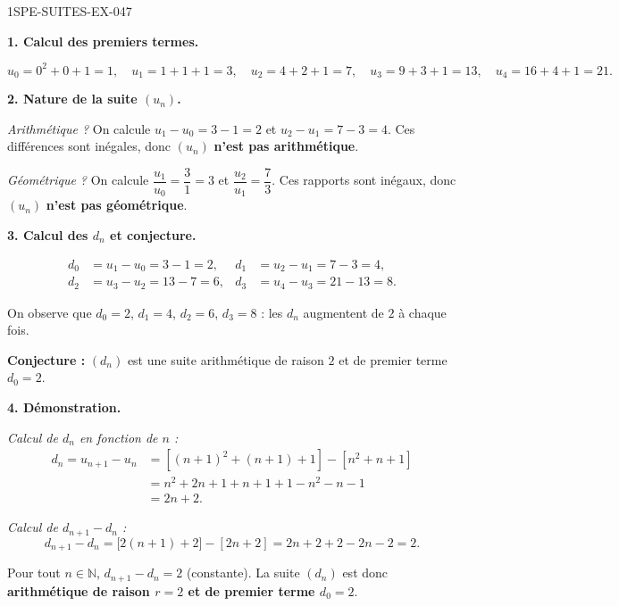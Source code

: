 \begin{corrige}{1SPE-SUITES-EX-047}

\textbf{1. Calcul des premiers termes.}

\[
u_0 = 0^2 + 0 + 1 = 1, \quad u_1 = 1 + 1 + 1 = 3, \quad u_2 = 4 + 2 + 1 = 7, \quad u_3 = 9 + 3 + 1 = 13, \quad u_4 = 16 + 4 + 1 = 21.
\]

\textbf{2. Nature de la suite $(u_n)$.}


\textit{Arithmétique ?} On calcule $u_1 - u_0 = 3 - 1 = 2$ et $u_2 - u_1 = 7 - 3 = 4$. Ces différences sont inégales, donc $(u_n)$ \textbf{n'est pas arithmétique}.

\textit{Géométrique ?} On calcule $\dfrac{u_1}{u_0} = \dfrac{3}{1} = 3$ et $\dfrac{u_2}{u_1} = \dfrac{7}{3}$. Ces rapports sont inégaux, donc $(u_n)$ \textbf{n'est pas géométrique}.

\textbf{3. Calcul des $d_n$ et conjecture.}

\[
\begin{aligned}
d_0 &= u_1 - u_0 = 3 - 1 = 2, &
d_1 &= u_2 - u_1 = 7 - 3 = 4, \\
d_2 &= u_3 - u_2 = 13 - 7 = 6, &
d_3 &= u_4 - u_3 = 21 - 13 = 8.
\end{aligned}
\]

On observe que $d_0 = 2$, $d_1 = 4$, $d_2 = 6$, $d_3 = 8$ : les $d_n$ augmentent de $2$ à chaque fois.

\textbf{Conjecture :} $(d_n)$ est une suite arithmétique de raison $2$ et de premier terme $d_0 = 2$.

\textbf{4. Démonstration.}


\textit{Calcul de $d_n$ en fonction de $n$ :}
\begin{align*}
d_n = u_{n+1} - u_n &= \left[(n+1)^2 + (n+1) + 1\right] - \left[n^2 + n + 1\right] \\
&= n^2 + 2n + 1 + n + 1 + 1 - n^2 - n - 1 \\
&= 2n + 2.
\end{align*}

\textit{Calcul de $d_{n+1} - d_n$ :}
\[
d_{n+1} - d_n = \bigl[2(n+1) + 2\bigr] - [2n + 2] = 2n + 2 + 2 - 2n - 2 = 2.
\]

Pour tout $n \in \mathbb{N}$, $d_{n+1} - d_n = 2$ (constante). La suite $(d_n)$ est donc \textbf{arithmétique de raison $r = 2$ et de premier terme $d_0 = 2$}.


\end{corrige}
